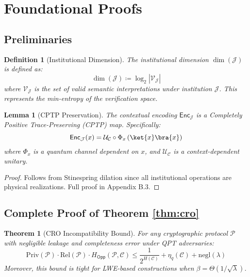 \documentclass[preprint,12pt]{elsarticle}
\newtheorem{definition}{Definition}[section]
\newtheorem{theorem}{Theorem}[section]
\newtheorem{lemma}{Lemma}[section]
\newcommand{\negl}{\mathrm{negl}}
\begin{document}
    \newpage
    \appendix
        \section{Foundational Proofs}\label{app:Appendix_A}

            \subsection{Preliminaries}\label{app:A.1_prelim}

                \begin{definition}[Institutional Dimension]\label{def:dimJ}
                    The institutional dimension $\dim(\mathcal{J})$ is defined as:
                    \[
                    \dim(\mathcal{J}) \coloneqq \log_2 |\mathcal{V}_{\mathcal{J}}|
                    \]
                    where $\mathcal{V}_{\mathcal{J}}$ is the set of valid semantic interpretations under institution $\mathcal{J}$. This represents the min-entropy of the verification space.
                \end{definition}

                \begin{lemma}[CPTP Preservation]\label{lem:cptp}
                    The contextual encoding $\mathsf{Enc}_{\mathcal{J}}$ is a Completely Positive Trace-Preserving (CPTP) map. Specifically:
                    \[
                    \mathsf{Enc}_{\mathcal{J}}(x) = \mathcal{U}_{\mathcal{C}} \circ \Phi_x \left( \ket{x}\bra{x} \right)
                    \]
                    where $\Phi_x$ is a quantum channel dependent on $x$, and $\mathcal{U}_{\mathcal{C}}$ is a context-dependent unitary.
                \end{lemma}
                \begin{proof}
                    Follows from Stinespring dilation since all institutional operations are physical realizations. Full proof in Appendix B.3.
                \end{proof}

            \subsection{Complete Proof of Theorem \ref{thm:cro}}\label{app:A.2_proof_thm_cro}

                \begin{theorem}[CRO Incompatibility Bound]\label{thm:cro_impossibility} 
                    For any cryptographic protocol $\mathcal{P}$ with negligible leakage and completeness error under QPT adversaries:
                    \begin{equation}\label{eq:cro_impossibility}
                        \mathrm{Priv}(\mathcal{P}) \cdot \mathrm{Rel}(\mathcal{P}) \cdot H_{\mathsf{Opp}}(\mathcal{P}, \mathcal{C}) \leq \frac{1}{2^{H(\mathcal{C})}} + \eta_q(\mathcal{C}) + \negl(\lambda)
                    \end{equation}
                    Moreover, this bound is tight for LWE-based constructions when $\beta = \Theta(1/\sqrt{\lambda})$.
                \end{theorem}
\end{document}
